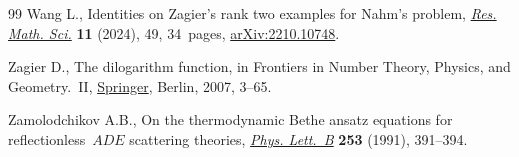 \documentclass[10pt,a4paper]{amsart}
\numberwithin{equation}{section}
\theoremstyle{definition}
\begin{document}
\begin{thebibliography}{99}
Wang L., Identities on {Z}agier's rank two examples for {N}ahm's problem,
 \href{https://doi.org/10.1007/s40687-024-00460-z}{\textit{Res. Math. Sci.}}
 \textbf{11} (2024), 49, 34~pages,
 \href{http://arxiv.org/abs/2210.10748}{arXiv:2210.10748}.

Zagier D., The dilogarithm function, in Frontiers in {N}umber {T}heory,
 {P}hysics, and {G}eometry.~{II},
 \href{https://doi.org/10.1007/978-3-540-30308-4_1}{Springer}, Berlin, 2007,
 3--65.

Zamolodchikov A.B., On the thermodynamic {B}ethe ansatz equations for
 reflectionless~{$ADE$} scattering theories,
 \href{https://doi.org/10.1016/0370-2693(91)91737-G}{\textit{Phys. Lett.~B}}
 \textbf{253} (1991), 391--394.

\end{thebibliography}
\end{document}

